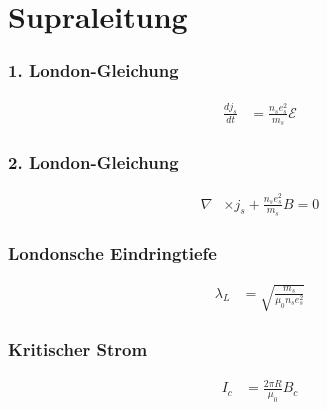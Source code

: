 \section{Supraleitung}

\subsubsection*{1. London-Gleichung}
\begin{equation*}
    \begin{aligned}
        \frac{dj_s}{dt} &= \frac{n_s e_s^2}{m_s} \mathcal{E}
    \end{aligned}
\end{equation*}

\subsubsection*{2. London-Gleichung}
\begin{equation*}
    \begin{aligned}
        \nabla &\times j_s + \frac{n_s e_s^2}{m_s} B = 0
    \end{aligned}
\end{equation*}

\subsubsection*{Londonsche Eindringtiefe}
\begin{equation*}
    \begin{aligned}
        \lambda_L &= \sqrt{\frac{m_s}{\mu_0 n_s e_s^2}}
    \end{aligned}
\end{equation*}

\subsubsection*{Kritischer Strom}
\begin{equation*}
    \begin{aligned}
        I_c &= \frac{2 \pi R}{\mu_0} B_c
    \end{aligned}
\end{equation*}